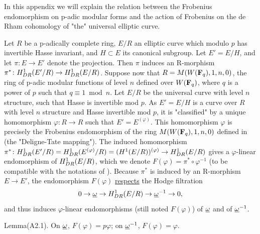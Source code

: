 
In this appendix we will explain the relation between the Frobenius
endomorphism on p-adic modular forms and the action of Frobenius on the de Rham
cohomology of "the" universal elliptic curve.

 Let $R$ be a p-adically complete ring, $E/R$ an elliptic curve
which modulo $p$ has invertible Hasse invariant, and $H\subset E$ its canonical
subgroup. Let $E'=E/H$, and let $\pi\colon E\to E'$ denote the projection. Then
$\pi$ induces an R-morphism
$\pi^*\colon H^1_{DR}(E'/R)\to H^1_{DR}(E/R)$. Suppose now that
$R=M(W(\mathbf{F}_q),1,n,0)$, the ring of p-adic modular functions of level $n$ defined
over $W(\mathbf{F}_q)$, where $q$ is a power of $p$ such that $q\equiv 1 \bmod n$. Let
$E/R$ be the universal curve with level $n$ structure, such that Hasse is
invertible mod $p$. As $E'=E/H$ is a curve over $R$ with level $n$ structure and
Hasse invertible mod $p$, it is "classified" by a unique homomorphism
$\varphi\colon R\to R$ such that $E'=E^{(\varphi)}$. This homomorphism $\varphi$
is precisely the Frobenius endomorphism of the ring $M(W(\mathbf{F}_q),1,n,0)$ defined
in \cite{dwork69} (the "Deligne-Tate mapping"). The induced homomorphism
$\pi^*\colon H^1_{DR}(E'/R)=H^1_{DR}(E^{(\varphi)}/R)=(H^1(E/R))^{(\varphi)}
\to H^1_{DR}(E/R)$ gives a $\varphi$-linear endomorphism of $H^1_{DR}(E/R)$,
which we denote $F(\varphi)=\pi^*\circ\varphi^{-1}$ (to be compatible with the
notations of \cite{katz73}). Because $\pi^*$ is induced by an R-morphism $E\to E'$, the
endomorphism $F(\varphi)$ \uline{respects} the Hodge filtration
\[
0\to\underline{\omega}\to H^1_{DR}(E/R)\to\underline{\omega}^{-1}\to 0 ,
\]
and thus induces $\varphi$-linear endomorphisms (still noted $F(\varphi)$) of
$\underline{\omega}$ and of $\underline{\omega}^{-1}$.


\begin{kathm}{Lemma}{(A2.1).}
On $\underline{\omega}$, $F(\varphi)=p\varphi$; on $\underline{\omega}^{-1}$, $F(\varphi)=\varphi$.
\end{kathm}

